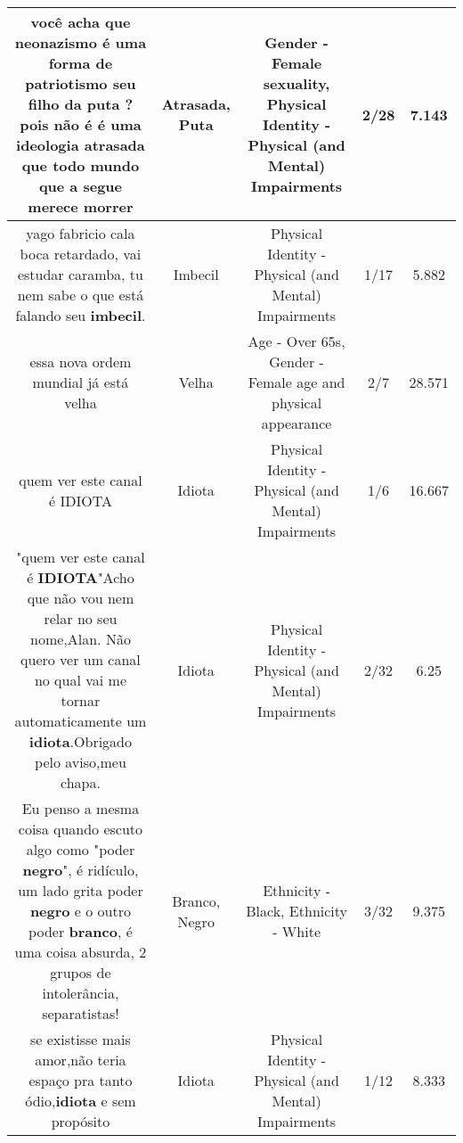 \documentclass[11pt]{article}
\newlength\mylength
\begin{document}
\begin{center}
\begin{longtable}{|C{.65\mylength}|C{.30\mylength}|C{.12\mylength}|C{.12\mylength}|C{.12\mylength}|}
  \small você acha que neonazismo é uma forma de patriotismo seu filho da \textbf{puta} ?pois não é é uma ideologia \textbf{atrasada} que todo mundo que a segue merece morrer\normalsize   & Atrasada, Puta & Gender - Female sexuality, Physical Identity - Physical (and Mental) Impairments & 2/28 & 7.143 \\  \hline
  \small yago fabricio cala boca retardado, vai estudar caramba, tu nem sabe o que está falando seu \textbf{imbecil}.\normalsize   & Imbecil & Physical Identity - Physical (and Mental) Impairments & 1/17 & 5.882 \\  \hline
  \small essa nova ordem mundial já está velha\normalsize   & Velha & Age - Over 65s, Gender - Female age and physical appearance & 2/7 & 28.571 \\  \hline
  \small quem ver este canal é IDIOTA\normalsize   & Idiota & Physical Identity - Physical (and Mental) Impairments & 1/6 & 16.667 \\  \hline
  \small "quem ver este canal é \textbf{IDIOTA}"Acho que não vou nem relar no seu nome,Alan. Não quero ver um canal no qual vai me tornar automaticamente um \textbf{idiota}.Obrigado pelo aviso,meu chapa.\normalsize   & Idiota & Physical Identity - Physical (and Mental) Impairments & 2/32 & 6.25 \\  \hline
  \small Eu penso a mesma coisa quando escuto algo como "poder \textbf{negro}", é ridículo, um lado grita poder \textbf{negro} e o outro poder \textbf{branco}, é uma coisa absurda, 2 grupos de intolerância, separatistas!\normalsize   & Branco, Negro & Ethnicity - Black, Ethnicity - White & 3/32 & 9.375 \\  \hline
  \small se existisse mais amor,não teria espaço pra tanto ódio,\textbf{idiota} e sem propósito\normalsize   & Idiota & Physical Identity - Physical (and Mental) Impairments & 1/12 & 8.333 \\  \hline

\end{longtable}
\end{center}
\end{document}
